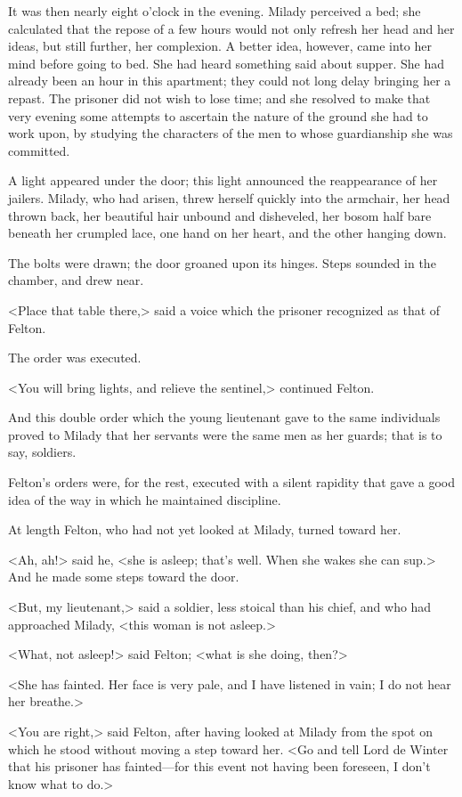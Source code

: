 It was then nearly eight o'clock in the evening. Milady perceived a bed; she calculated that the repose of a few hours would not only refresh her head and her ideas, but still further, her complexion. A better idea, however, came into her mind before going to bed. She had heard something said about supper. She had already been an hour in this apartment; they could not long delay bringing her a repast. The prisoner did not wish to lose time; and she resolved to make that very evening some attempts to ascertain the nature of the ground she had to work upon, by studying the characters of the men to whose guardianship she was committed. 

A light appeared under the door; this light announced the reappearance of her jailers. Milady, who had arisen, threw herself quickly into the armchair, her head thrown back, her beautiful hair unbound and disheveled, her bosom half bare beneath her crumpled lace, one hand on her heart, and the other hanging down. 

The bolts were drawn; the door groaned upon its hinges. Steps sounded in the chamber, and drew near. 

<Place that table there,> said a voice which the prisoner recognized as that of Felton. 

The order was executed. 

<You will bring lights, and relieve the sentinel,> continued Felton. 

And this double order which the young lieutenant gave to the same individuals proved to Milady that her servants were the same men as her guards; that is to say, soldiers. 

Felton's orders were, for the rest, executed with a silent rapidity that gave a good idea of the way in which he maintained discipline. 

At length Felton, who had not yet looked at Milady, turned toward her. 

<Ah, ah!> said he, <she is asleep; that's well. When she wakes she can sup.> And he made some steps toward the door. 

<But, my lieutenant,> said a soldier, less stoical than his chief, and who had approached Milady, <this woman is not asleep.> 

<What, not asleep!> said Felton; <what is she doing, then?> 

<She has fainted. Her face is very pale, and I have listened in vain; I do not hear her breathe.> 

<You are right,> said Felton, after having looked at Milady from the spot on which he stood without moving a step toward her. <Go and tell Lord de Winter that his prisoner has fainted---for this event not having been foreseen, I don't know what to do.> 

